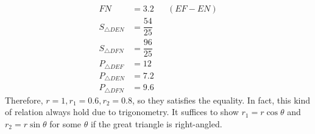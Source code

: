 \documentclass[12pt]{article}
\begin{document}
\begin{enumerate}
\begin{align*}
            FN &= 3.2 &&(EF - EN)\\
            S_{\triangle DEN} &= \dfrac{54}{25}\\
            S_{\triangle DFN} &= \dfrac{96}{25}\\
            P_{\triangle DEF} &= 12\\
            P_{\triangle DEN} &= 7.2\\
            P_{\triangle DFN} &= 9.6
        \end{align*}Therefore, $r=1, r_1=0.6, r_2=0.8$, so they satisfies the equality. In fact, this kind of relation always hold due to trigonometry. It suffices to show $r_1=r\cos{\theta}$ and $r_2=r\sin{\theta}$ for some $\theta$ if the great triangle is right-angled.
    \end{enumerate}

    \newpage
\end{document}
